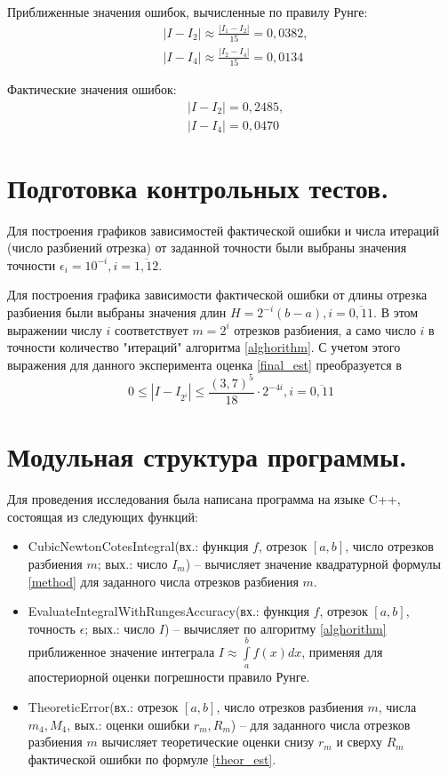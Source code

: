 \documentclass[a4paper, 12pt]{article}
\begin{document}
	Приближенные значения ошибок, вычисленные по правилу Рунге:
	\begin{equation*}
		\begin{aligned}
			&|I-I_2|\approx\frac{|I_1-I_2|}{15}=0,0382,\\
			&|I-I_4|\approx\frac{|I_2-I_4|}{15}=0,0134
		\end{aligned}
	\end{equation*}

	Фактические значения ошибок:
	\begin{equation*}
		\begin{aligned}
			&|I-I_2|=0,2485,\\
			&|I-I_4|=0,0470
		\end{aligned}
	\end{equation*}
	
	\section{Подготовка контрольных тестов.}
	
	Для построения графиков зависимостей фактической ошибки и числа итераций (число разбиений отрезка) от заданной точности были выбраны значения точности $\epsilon_i=10^{-i}, i=\overline{1,12}$. 
	
	Для построения графика зависимости фактической ошибки от длины отрезка разбиения были выбраны значения длин $H=2^{-i}(b-a), i=\overline{0,11}$. В этом выражении числу $i$ соответствует $m=2^{i}$ отрезков разбиения, а само число $i$ в точности количество "итераций" алгоритма \ref{alghorithm}. С учетом этого выражения для данного эксперимента оценка \eqref{final_est} преобразуется в
	\begin{equation}
		0 \leq |I-I_{2^i}| \leq \frac{(3,7)^5}{18}\cdot2^{-4i}, i=\overline{0,11}
	\end{equation}
	
	\section{Модульная структура программы.}
	Для проведения исследования была написана программа на языке C++, состоящая из следующих функций:
	\begin{itemize}
		\item CubicNewtonCotesIntegral(вх.: функция $f$, отрезок $[a,b]$, число отрезков разбиения $m$; вых.: число $I_m$) -- вычисляет значение квадратурной формулы \eqref{method} для заданного числа отрезков разбиения $m$.
		\item EvaluateIntegralWithRungesAccuracy(вх.: функция $f$, отрезок $[a,b]$, точность $\epsilon$; вых.: число $I$) -- вычисляет по алгоритму \ref{alghorithm} приближенное значение интеграла $I\approx\int\limits_a^bf(x)dx$, применяя для апостериорной оценки погрешности правило Рунге.
		\item TheoreticError(вх.: отрезок $[a,b]$, число отрезков разбиения $m$, числа $m_4,M_4$, вых.: оценки ошибки $r_m,R_m$) -- для заданного числа отрезков разбиения $m$ вычисляет теоретические оценки снизу $r_m$ и сверху $R_m$ фактической ошибки по формуле \eqref{theor_est}.
	\end{itemize}
	
\end{document}
